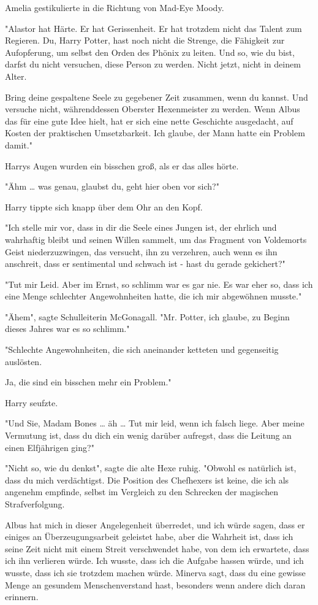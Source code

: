 {Amelia gestikulierte in die Richtung von Mad-Eye Moody.

"Alastor hat Härte. Er hat Gerissenheit. Er hat trotzdem nicht das Talent zum Regieren. Du, Harry Potter, hast noch nicht die Strenge, die Fähigkeit zur Aufopferung, um selbst den Orden des Phönix zu leiten. Und so, wie du bist, darfst du nicht versuchen, diese Person zu werden. Nicht jetzt, nicht in deinem Alter.

Bring deine gespaltene Seele zu gegebener Zeit zusammen, wenn du kannst. Und versuche nicht, währenddessen Oberster Hexenmeister zu werden. Wenn Albus das für eine gute Idee hielt, hat er sich eine nette Geschichte ausgedacht, auf Kosten der praktischen Umsetzbarkeit. Ich glaube, der Mann hatte ein Problem damit."

Harrys Augen wurden ein bisschen groß, als er das alles hörte.

"Ähm … was genau, glaubst du, geht hier oben vor sich?"

Harry tippte sich knapp über dem Ohr an den Kopf.

"Ich stelle mir vor, dass in dir die Seele eines Jungen ist, der ehrlich und wahrhaftig bleibt und seinen Willen sammelt, um das Fragment von Voldemorts Geist niederzuzwingen, das versucht, ihn zu verzehren, auch wenn es ihn anschreit, dass er sentimental und schwach ist - hast du gerade gekichert?"

"Tut mir Leid. Aber im Ernst, so schlimm war es gar nie. Es war eher so, dass ich eine Menge schlechter Angewohnheiten hatte, die ich mir abgewöhnen musste."

"Ähem", sagte Schulleiterin McGonagall. "Mr. Potter, ich glaube, zu Beginn dieses Jahres war es so schlimm."

"Schlechte Angewohnheiten, die sich aneinander ketteten und gegenseitig auslösten.

Ja, die sind ein bisschen mehr ein Problem."

Harry seufzte.

"Und Sie, Madam Bones … äh … Tut mir leid, wenn ich falsch liege. Aber meine Vermutung ist, dass du dich ein wenig darüber aufregst, dass die Leitung an einen Elfjährigen ging?"

"Nicht so, wie du denkst", sagte die alte Hexe ruhig. "Obwohl es natürlich ist, dass du mich verdächtigst. Die Position des Chefhexers ist keine, die ich als angenehm empfinde, selbst im Vergleich zu den Schrecken der magischen Strafverfolgung.

Albus hat mich in dieser Angelegenheit überredet, und ich würde sagen, dass er einiges an Überzeugungsarbeit geleistet habe, aber die Wahrheit ist, dass ich seine Zeit nicht mit einem Streit verschwendet habe, von dem ich erwartete, dass ich ihn verlieren würde. Ich wusste, dass ich die Aufgabe hassen würde, und ich wusste, dass ich sie trotzdem machen würde. Minerva sagt, dass du eine gewisse Menge an gesundem Menschenverstand hast, besonders wenn andere dich daran erinnern.

}
